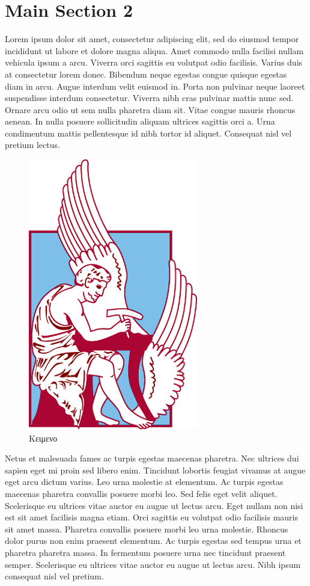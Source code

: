 \section{Main Section 2}
Lorem ipsum dolor sit amet, consectetur adipiscing elit, sed do eiusmod tempor incididunt ut labore et dolore magna aliqua. Amet commodo nulla facilisi nullam vehicula ipsum a arcu. Viverra orci sagittis eu volutpat odio facilisis. Varius duis at consectetur lorem donec. Bibendum neque egestas congue quisque egestas diam in arcu. Augue interdum velit euismod in. Porta non pulvinar neque laoreet suspendisse interdum consectetur. Viverra nibh cras pulvinar mattis nunc sed. Ornare arcu odio ut sem nulla pharetra diam sit. Vitae congue mauris rhoncus aenean. In nulla posuere sollicitudin aliquam ultrices sagittis orci a. Urna condimentum mattis pellentesque id nibh tortor id aliquet. Consequat nisl vel pretium lectus.

\begin{figure}[H]
	\centering
	\includegraphics[width=0.4\columnwidth]{Images/university}
	\caption{Κειμενο}
\end{figure}

Netus et malesuada fames ac turpis egestas maecenas pharetra. Nec ultrices dui sapien eget mi proin sed libero enim. Tincidunt lobortis feugiat vivamus at augue eget arcu dictum varius. Leo urna molestie at elementum. Ac turpis egestas maecenas pharetra convallis posuere morbi leo. Sed felis eget velit aliquet. Scelerisque eu ultrices vitae auctor eu augue ut lectus arcu. Eget nullam non nisi est sit amet facilisis magna etiam. Orci sagittis eu volutpat odio facilisis mauris sit amet massa. Pharetra convallis posuere morbi leo urna molestie. Rhoncus dolor purus non enim praesent elementum. Ac turpis egestas sed tempus urna et pharetra pharetra massa. In fermentum posuere urna nec tincidunt praesent semper. Scelerisque eu ultrices vitae auctor eu augue ut lectus arcu. Nibh ipsum consequat nisl vel pretium.


